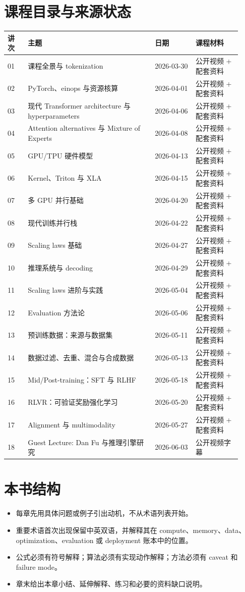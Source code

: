 \documentclass[a4paper]{article}
\begin{document}
\section*{课程目录与来源状态}
\begin{longtable}{p{0.08\linewidth}p{0.50\linewidth}p{0.16\linewidth}p{0.18\linewidth}}
\toprule
\textbf{讲次} & \textbf{主题} & \textbf{日期} & \textbf{课程材料}\\
\midrule
01 & 课程全景与 tokenization & 2026-03-30 & 公开视频 + 配套资料\\
02 & PyTorch、einops 与资源核算 & 2026-04-01 & 公开视频 + 配套资料\\
03 & 现代 Transformer architecture 与 hyperparameters & 2026-04-06 & 公开视频 + 配套资料\\
04 & Attention alternatives 与 Mixture of Experts & 2026-04-08 & 公开视频 + 配套资料\\
05 & GPU/TPU 硬件模型 & 2026-04-13 & 公开视频 + 配套资料\\
06 & Kernel、Triton 与 XLA & 2026-04-15 & 公开视频 + 配套资料\\
07 & 多 GPU 并行基础 & 2026-04-20 & 公开视频 + 配套资料\\
08 & 现代训练并行栈 & 2026-04-22 & 公开视频 + 配套资料\\
09 & Scaling laws 基础 & 2026-04-27 & 公开视频 + 配套资料\\
10 & 推理系统与 decoding & 2026-04-29 & 公开视频 + 配套资料\\
11 & Scaling laws 进阶与实践 & 2026-05-04 & 公开视频 + 配套资料\\
12 & Evaluation 方法论 & 2026-05-06 & 公开视频 + 配套资料\\
13 & 预训练数据：来源与数据集 & 2026-05-11 & 公开视频 + 配套资料\\
14 & 数据过滤、去重、混合与合成数据 & 2026-05-13 & 公开视频 + 配套资料\\
15 & Mid/Post-training：SFT 与 RLHF & 2026-05-18 & 公开视频 + 配套资料\\
16 & RLVR：可验证奖励强化学习 & 2026-05-20 & 公开视频 + 配套资料\\
17 & Alignment 与 multimodality & 2026-05-27 & 公开视频 + 配套资料\\
18 & Guest Lecture: Dan Fu 与推理引擎研究 & 2026-06-03 & 公开视频字幕\\
\bottomrule
\end{longtable}
\section*{本书结构}
\begin{itemize}
\item 每章先用具体问题或例子引出动机，不从术语列表开始。
\item 重要术语首次出现保留中英双语，并解释其在 compute、memory、data、optimization、evaluation 或 deployment 账本中的位置。
\item 公式必须有符号解释；算法必须有实现动作解释；方法必须有 caveat 和 failure mode。
\item 章末给出本章小结、延伸解释、练习和必要的资料缺口说明。
\end{itemize}
\end{document}
